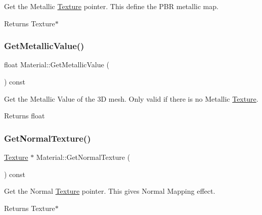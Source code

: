 Get the Metallic \hyperlink{classTexture}{Texture} pointer. This define the P\+BR metallic map. 

\begin{DoxyReturn}{Returns}
Texture$\ast$ 
\end{DoxyReturn}
\mbox{\label{classMaterial_a491f2523cf8b159352c0137057c94212}} 
\subsubsection{\texorpdfstring{Get\+Metallic\+Value()}{GetMetallicValue()}}
{\footnotesize\ttfamily float Material\+::\+Get\+Metallic\+Value (\begin{DoxyParamCaption}{ }\end{DoxyParamCaption}) const}



Get the Metallic Value of the 3D mesh. Only valid if there is no Metallic \hyperlink{classTexture}{Texture}. 

\begin{DoxyReturn}{Returns}
float 
\end{DoxyReturn}
\mbox{\label{classMaterial_a308bae8e2917d3dabceb2921c87d6e6f}} 
\subsubsection{\texorpdfstring{Get\+Normal\+Texture()}{GetNormalTexture()}}
{\footnotesize\ttfamily \hyperlink{classTexture}{Texture} $\ast$ Material\+::\+Get\+Normal\+Texture (\begin{DoxyParamCaption}{ }\end{DoxyParamCaption}) const}



Get the Normal \hyperlink{classTexture}{Texture} pointer. This gives Normal Mapping effect. 

\begin{DoxyReturn}{Returns}
Texture$\ast$ 
\end{DoxyReturn}
\mbox{\label{classMaterial_a6b55a54f7f10121c760abb79f2f7a410}} 
